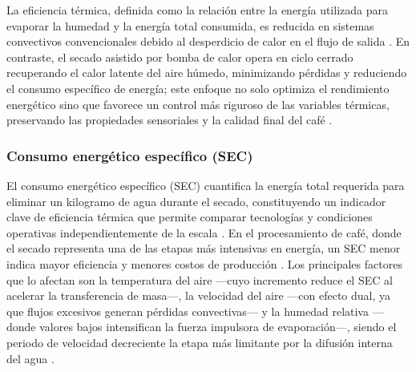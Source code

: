 La eficiencia térmica, definida como la relación entre la energía utilizada para 
evaporar la humedad y la energía total consumida, es reducida en sistemas convectivos 
convencionales debido al desperdicio de calor en el flujo de salida 
\parencite{abbaspour-gilandeh_effect_2021, gomez-daza_innovacion_2023, li_study_2021, 
burdo_energy-efficient_2025}. En contraste, el secado asistido por bomba de calor 
opera en ciclo cerrado recuperando el calor latente del aire húmedo, minimizando 
pérdidas y reduciendo el consumo específico de energía; este enfoque no solo optimiza 
el rendimiento energético sino que favorece un control más riguroso de las variables 
térmicas, preservando las propiedades sensoriales y la calidad final del café 
\parencite{burdo_energy-efficient_2025, gomez-daza_innovacion_2023, pramono_low_2022, 
rabello_modeling_2021}.

\subsubsection{Consumo energético específico (SEC)}

El consumo energético específico (SEC) cuantifica la energía total requerida para 
eliminar un kilogramo de agua durante el secado, constituyendo un indicador clave 
de eficiencia térmica que permite comparar tecnologías y condiciones operativas 
independientemente de la escala \parencite{burdo_energy-efficient_2025, 
el-mesery_application_2025-1, liu_optimization_2025, gomez-daza_innovacion_2023, 
institute_of_food_and_biotechnology_can_tho_university_vietnam_impact_2022}. En el 
procesamiento de café, donde el secado representa una de las etapas más intensivas 
en energía, un SEC menor indica mayor eficiencia y menores costos de producción 
\parencite{cansee_effect_2026, cruz-ospina_improving_2026, 
leonardo_barcelos_mateus_modeling_2021, chojnacka_improvements_2021, 
kaveh_comparative_2023}. Los principales factores que lo afectan son la temperatura 
del aire —cuyo incremento reduce el SEC al acelerar la transferencia de masa—, la 
velocidad del aire —con efecto dual, ya que flujos excesivos generan pérdidas 
convectivas— y la humedad relativa —donde valores bajos intensifican la fuerza 
impulsora de evaporación—, siendo el periodo de velocidad decreciente la etapa más 
limitante por la difusión interna del agua 
\parencite{institute_of_food_and_biotechnology_can_tho_university_vietnam_impact_2022, 
abbaspour-gilandeh_effect_2021, kaveh_comparative_2023, el-mesery_application_2025-1, 
liu_optimization_2025, cruz-ospina_improving_2026, gomez-daza_innovacion_2023, 
li_study_2021, yu_current_2025}.

